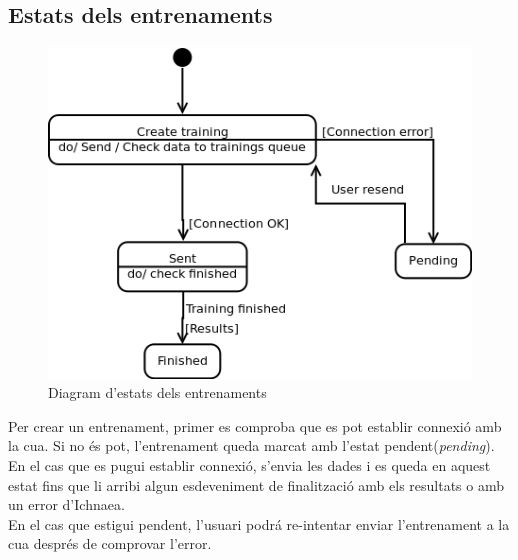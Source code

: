 \subsection{Estats dels entrenaments}
\begin{figure}[H]
  \centering
  \includegraphics[scale=0.4]{img/specification/StatesTraining.png}
  \caption{Diagram d'estats dels entrenaments}
  \label{fig:statestraining}
\end{figure}
Per crear un entrenament, primer es comproba que es pot establir connexi\'{o} amb la cua. Si no \'{e}s pot, l'entrenament queda marcat amb l'estat pendent(\textit{pending}). En el cas que es pugui establir connexi\'{o}, s'envia les dades i es queda en aquest estat fins que li arribi algun esdeveniment de finalitzaci\'{o} amb els resultats o amb un error d'Ichnaea.\\
En el cas que estigui pendent, l'usuari podr\'{a} re-intentar enviar l'entrenament a la cua despr\'{e}s de comprovar l'error.

